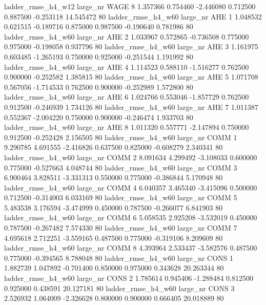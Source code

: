  ladder_rmse_h4_w12   large_nr     WAGE                 8  1.357366  0.754460  -2.446080 0.712500 0.887500 -0.253118   14.545472 80
 ladder_rmse_h4_w60   large_nr      AHE                 1  1.048532  0.621515  -0.189716 0.875000 0.987500 -0.190640    0.781986 80
 ladder_rmse_h4_w60   large_nr      AHE                 2  1.033967  0.572865  -0.736508 0.775000 0.975000 -0.198058    0.937796 80
 ladder_rmse_h4_w60   large_nr      AHE                 3  1.161975  0.603485  -1.265193 0.750000 0.925000 -0.251544    1.191992 80
 ladder_rmse_h4_w60   large_nr      AHE                 4  1.114523  0.588110  -1.516277 0.762500 0.900000 -0.252582    1.385815 80
 ladder_rmse_h4_w60   large_nr      AHE                 5  1.071708  0.567056  -1.714533 0.762500 0.900000 -0.252989    1.572800 80
 ladder_rmse_h4_w60   large_nr      AHE                 6  1.024766  0.553046  -1.857729 0.762500 0.912500 -0.246939    1.734126 80
 ladder_rmse_h4_w60   large_nr      AHE                 7  1.011387  0.552367  -2.004220 0.750000 0.900000 -0.246474    1.933703 80
 ladder_rmse_h4_w60   large_nr      AHE                 8  1.011320  0.557771  -2.147894 0.750000 0.912500 -0.252428    2.156505 80
 ladder_rmse_h4_w60   large_nr     COMM                 1  9.290785  4.691555  -2.416826 0.637500 0.825000 -0.608279    2.340341 80
 ladder_rmse_h4_w60   large_nr     COMM                 2  8.091634  4.299492  -3.108033 0.600000 0.775000 -0.527663    4.048744 80
 ladder_rmse_h4_w60   large_nr     COMM                 3  6.900464  3.828511  -3.331313 0.550000 0.775000 -0.386844    5.170948 80
 ladder_rmse_h4_w60   large_nr     COMM                 4  6.040357  3.465340  -3.415096 0.500000 0.712500 -0.314003    6.033169 80
 ladder_rmse_h4_w60   large_nr     COMM                 5  5.483538  3.176594  -3.474999 0.450000 0.787500 -0.266077    6.841903 80
 ladder_rmse_h4_w60   large_nr     COMM                 6  5.058535  2.925208  -3.532019 0.450000 0.787500 -0.267482    7.574330 80
 ladder_rmse_h4_w60   large_nr     COMM                 7  4.695618  2.712251  -3.559165 0.487500 0.775000 -0.319106    8.209609 80
 ladder_rmse_h4_w60   large_nr     COMM                 8  4.393964  2.533437  -3.582576 0.487500 0.775000 -0.394565    8.788048 80
 ladder_rmse_h4_w60   large_nr     CONS                 1  1.882739  1.047892  -0.701400 0.850000 0.975000  0.343628   20.263344 80
 ladder_rmse_h4_w60   large_nr     CONS                 2  1.785614  0.945406  -1.288484 0.812500 0.925000  0.438591   20.127181 80
 ladder_rmse_h4_w60   large_nr     CONS                 3  2.526932  1.064009  -2.326628 0.800000 0.900000  0.666405   20.018889 80
